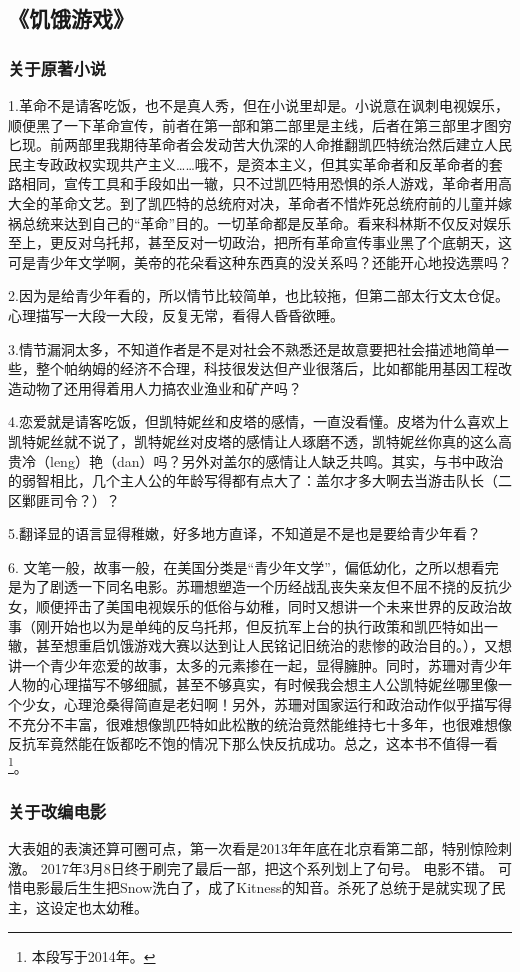 \subsection{《饥饿游戏》}

\subsubsection{关于原著小说}

1.革命不是请客吃饭，也不是真人秀，但在小说里却是。小说意在讽刺电视娱乐，顺便黑了一下革命宣传，前者在第一部和第二部里是主线，后者在第三部里才图穷匕现。前两部里我期待革命者会发动苦大仇深的人命推翻凯匹特统治然后建立人民民主专政政权实现共产主义……哦不，是资本主义，但其实革命者和反革命者的套路相同，宣传工具和手段如出一辙，只不过凯匹特用恐惧的杀人游戏，革命者用高大全的革命文艺。到了凯匹特的总统府对决，革命者不惜炸死总统府前的儿童并嫁祸总统来达到自己的“革命”目的。一切革命都是反革命。看来科林斯不仅反对娱乐至上，更反对乌托邦，甚至反对一切政治，把所有革命宣传事业黑了个底朝天，这可是青少年文学啊，美帝的花朵看这种东西真的没关系吗？还能开心地投选票吗？

2.因为是给青少年看的，所以情节比较简单，也比较拖，但第二部太行文太仓促。心理描写一大段一大段，反复无常，看得人昏昏欲睡。

3.情节漏洞太多，不知道作者是不是对社会不熟悉还是故意要把社会描述地简单一些，整个帕纳姆的经济不合理，科技很发达但产业很落后，比如都能用基因工程改造动物了还用得着用人力搞农业渔业和矿产吗？

4.恋爱就是请客吃饭，但凯特妮丝和皮塔的感情，一直没看懂。皮塔为什么喜欢上凯特妮丝就不说了，凯特妮丝对皮塔的感情让人琢磨不透，凯特妮丝你真的这么高贵冷（leng）艳（dan）吗？另外对盖尔的感情让人缺乏共鸣。其实，与书中政治的弱智相比，几个主人公的年龄写得都有点大了：盖尔才多大啊去当游击队长（二区鄛匪司令？）？

5.翻译显的语言显得稚嫩，好多地方直译，不知道是不是也是要给青少年看？

6. 文笔一般，故事一般，在美国分类是“青少年文学”，偏低幼化，之所以想看完是为了剧透一下同名电影。苏珊想塑造一个历经战乱丧失亲友但不屈不挠的反抗少女，顺便抨击了美国电视娱乐的低俗与幼稚，同时又想讲一个未来世界的反政治故事（刚开始也以为是单纯的反乌托邦，但反抗军上台的执行政策和凯匹特如出一辙，甚至想重启饥饿游戏大赛以达到让人民铭记旧统治的悲惨的政治目的。），又想讲一个青少年恋爱的故事，太多的元素掺在一起，显得臃肿。同时，苏珊对青少年人物的心理描写不够细腻，甚至不够真实，有时候我会想主人公凯特妮丝哪里像一个少女，心理沧桑得简直是老妇啊！另外，苏珊对国家运行和政治动作似乎描写得不充分不丰富，很难想像凯匹特如此松散的统治竟然能维持七十多年，也很难想像反抗军竟然能在饭都吃不饱的情况下那么快反抗成功。总之，这本书不值得一看\footnote{本段写于2014年。}。



\subsubsection{关于改编电影}

大表姐的表演还算可圈可点，第一次看是2013年年底在北京看第二部，特别惊险刺激。 
2017年3月8日终于刷完了最后一部，把这个系列划上了句号。 
电影不错。 
可惜电影最后生生把Snow洗白了，成了Kitness的知音。杀死了总统于是就实现了民主，这设定也太幼稚。